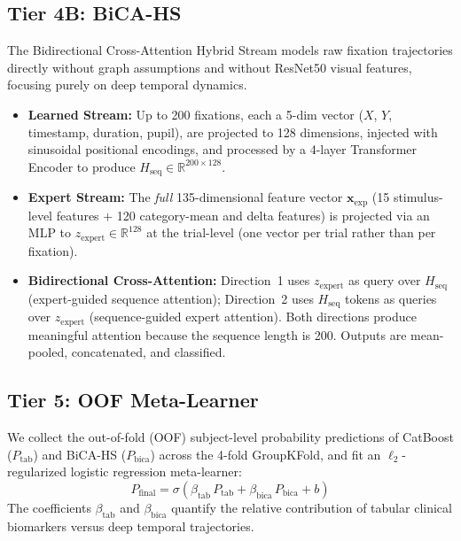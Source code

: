 \subsection{Tier 4B: BiCA-HS}
The Bidirectional Cross-Attention Hybrid Stream models raw fixation trajectories directly without graph assumptions and without ResNet50 visual features, focusing purely on deep temporal dynamics.
\begin{itemize}
    \item \textbf{Learned Stream:} Up to 200 fixations, each a 5-dim vector ($X$, $Y$, timestamp, duration, pupil), are projected to 128 dimensions, injected with sinusoidal positional encodings, and processed by a 4-layer Transformer Encoder to produce $H_\text{seq} \in \mathbb{R}^{200 \times 128}$. 
    
    
    \item \textbf{Expert Stream:} The \textit{full} 135-dimensional feature vector $\mathbf{x}_\text{exp}$ (15 stimulus-level features $+$ 120 category-mean and delta features) is projected via an MLP to $z_\text{expert} \in \mathbb{R}^{128}$ at the trial-level (one vector per trial rather than per fixation).
    \item \textbf{Bidirectional Cross-Attention:} Direction~1 uses $z_\text{expert}$ as query over $H_\text{seq}$ (expert-guided sequence attention); Direction~2 uses $H_\text{seq}$ tokens as queries over $z_\text{expert}$ (sequence-guided expert attention). Both directions produce meaningful attention because the sequence length is 200. Outputs are mean-pooled, concatenated, and classified.
\end{itemize}

\subsection{Tier 5: OOF Meta-Learner}
We collect the out-of-fold (OOF) subject-level probability predictions of CatBoost ($P_\text{tab}$) and BiCA-HS ($P_\text{bica}$) across the 4-fold GroupKFold, and fit an $\ell_2$-regularized logistic regression meta-learner:
\begin{equation}
    P_\text{final} = \sigma\!\left(\beta_\text{tab}\,P_\text{tab} + \beta_\text{bica}\,P_\text{bica} + b\right)
\end{equation}
The coefficients $\beta_\text{tab}$ and $\beta_\text{bica}$ quantify the relative contribution of tabular clinical biomarkers versus deep temporal trajectories.

